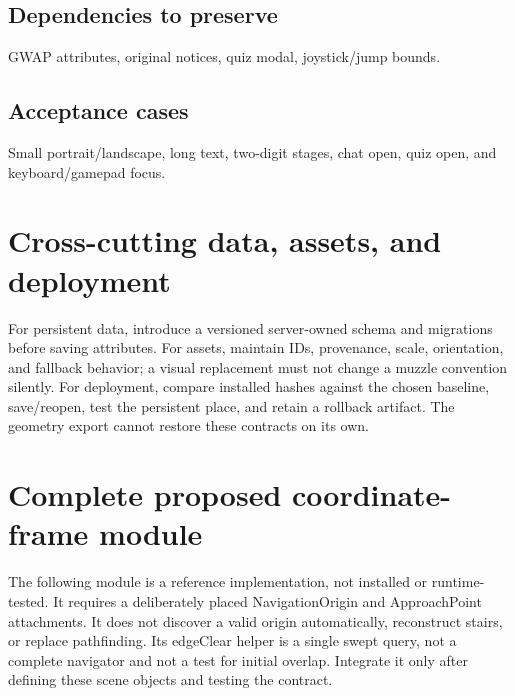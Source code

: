 \subsection{Dependencies to preserve}
GWAP attributes, original notices, quiz modal, joystick/\allowbreak{}jump bounds.\allowbreak{}

\subsection{Acceptance cases}
Small portrait/\allowbreak{}landscape, long text, two-digit stages, chat open, quiz open, and keyboard/\allowbreak{}gamepad focus.\allowbreak{}

\section{Cross-cutting data, assets, and deployment}
For persistent data, introduce a versioned server-owned schema and migrations before saving attributes.\allowbreak{} For assets, maintain IDs, provenance, scale, orientation, and fallback behavior; a visual replacement must not change a muzzle convention silently.\allowbreak{} For deployment, compare installed hashes against the chosen baseline, save/\allowbreak{}reopen, test the persistent place, and retain a rollback artifact.\allowbreak{} The geometry export cannot restore these contracts on its own.\allowbreak{}

\section{Complete proposed coordinate-frame module}
The following module is a reference implementation, not installed or runtime-tested.\allowbreak{} It requires a deliberately placed NavigationOrigin and ApproachPoint attachments.\allowbreak{} It does not discover a valid origin automatically, reconstruct stairs, or replace pathfinding.\allowbreak{} Its edgeClear helper is a single swept query, not a complete navigator and not a test for initial overlap.\allowbreak{} Integrate it only after defining these scene objects and testing the contract.\allowbreak{}

